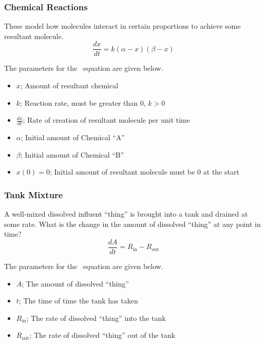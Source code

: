 \subsubsection{Chemical Reactions} \label{subsubsec:Chemical Reactions}
\begin{definition} \label{def:Chemical Reactions}
  These model how molecules interact in certain proportions to achieve some resultant molecule.
  \begin{equation} \label{eq:Chemical Reactions}
    \frac{dx}{dt} = k \left( \alpha - x \right) \left( \beta - x \right)
  \end{equation}
  \begin{remark}
    The parameters for the ~equation are given below.
    \begin{itemize}[noitemsep, nolistsep]
    \item $x$; Amount of resultant chemical
    \item $k$; Reaction rate, must be greater than 0, $k > 0$
    \item $\frac{dx}{dt}$; Rate of creation of resultant molecule per unit time
    \item $\alpha$; Initial amount of Chemical ``A''
    \item $\beta$; Initial amount of Chemical ``B''
    \item $x \left( 0 \right) = 0$; Initial amount of resultant molecule must be 0 at the start
    \end{itemize}
  \end{remark}
\end{definition}

\subsubsection{Tank Mixture} \label{subsubsec:Tank Mixture}
\begin{definition} \label{def:Tank Mixture}
  A well-mixed dissolved influent ``thing'' is brought into a tank and drained at some rate.
  What is the change in the amount of dissolved ``thing'' at any point in time?
  \begin{equation}\label{eq:Tank Mixture}
    \frac{dA}{dt} = R_{\text{in}} - R_{\text{out}}
  \end{equation}
  \begin{remark}
    The parameters for the ~equation are given below.
    \begin{itemize}[noitemsep, nolistsep]
    \item $A$; The amount of dissolved ``thing''
    \item $t$; The time of time the tank has taken
    \item $R_{\text{in}}$; The rate of dissolved ``thing'' into the tank
    \item $R_{\text{out}}$; The rate of dissolved ``thing'' out of the tank
    \end{itemize}
  \end{remark}
\end{definition}

